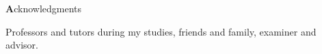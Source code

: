 \clearemptydoublepage
{}
{}

\vspace*{2cm}

\begin{center}
{\Large \textbf Acknowledgments}
\end{center}

\vspace{1cm}

\begin{center}
Professors and tutors during my studies, friends and family, examiner and advisor. %
\end{center}
